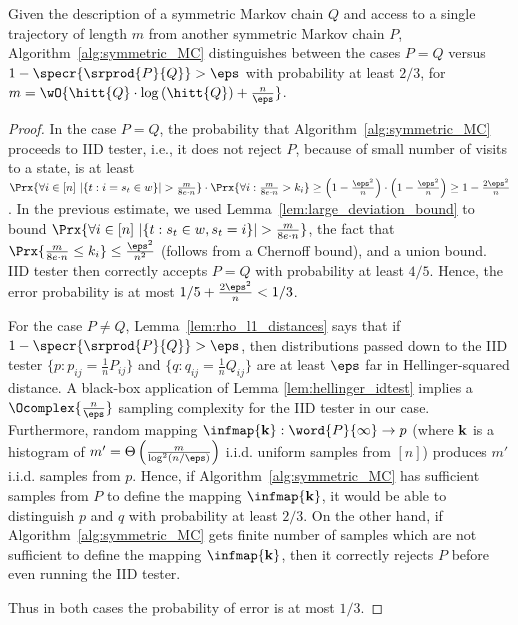 \begin{theorem}
Given the description of a symmetric Markov chain $Q$ and access to a single trajectory of length $m$ from another symmetric Markov chain $P$,
Algorithm~\ref{alg:symmetric_MC} distinguishes between the cases $P = Q$ versus $1-\specr{\srprod{P}{Q}}>\eps$ with probability at least $2/3$, for  $m=\wO{\hitt{Q}\cdot\log\left(\hitt{Q}\right)+\frac{n}{\eps}}$. 
\label{th:symmetric_ub}
\end{theorem}
\begin{proof}
	In the case $P=Q$, the probability that Algorithm~\ref{alg:symmetric_MC} proceeds to IID tester, i.e., it
	does not reject $P$, because of small number of visits to a state, is at least
	$\Prx{\forall i\in[n]~|\{t: i=s_t\in w\}|>\frac{m}{8e\cdot n}}\cdot\Prx{\forall i: \frac{m}{8e\cdot n}>k_i} \ge 
	\left(1-\frac{\eps^2}{n}\right)\cdot\left(1-\frac{\eps^2}{n}\right)\ge 1-\frac{2\eps^2}{n}$. In the previous estimate, we used Lemma~\ref{lem:large_deviation_bound} 
	to bound $\Prx{\forall i\in[n]~|\{t: s_t\in w, s_t=i\}|>\frac{m}{8e\cdot n}}$, the fact that $\Prx{\frac{m}{8e\cdot n} \le k_i} \le \frac{\eps^2}{n^2}$ (follows from a Chernoff bound), and a union bound.  IID tester then correctly accepts $P=Q$ with probability at least $4/5$.
	Hence, the error probability is at most $1/5+\frac{2\eps^2}{n}<1/3$.
	
	For the case $P\neq Q$, Lemma~\ref{lem:rho_l1_distances} says that if $1-\specr{\srprod{P}{Q}}>\eps$, then distributions passed down to the IID tester 
	$\{p: p_{ij}=\frac{1}{n}P_{ij}\}$ and $\{q: q_{ij}=\frac{1}{n}Q_{ij}\}$ are at least $\eps$ far in Hellinger-squared distance. A black-box application of Lemma \ref{lem:hellinger_idtest} implies a  $\Ocomplex{\frac{n}{\eps}}$ sampling complexity for the IID tester in our case.
	Furthermore,
	random mapping $\infmap{\vect{k}}:\word{P}{\infty}\to p$ (where $\mathbf{k}$ is a histogram of $m'=\Theta\left(\frac{m}{\log^2 (n/\eps)}\right)$ i.i.d. uniform samples from $[n]$) produces
	$m'$ i.i.d. samples from $p$. Hence, if Algorithm~\ref{alg:symmetric_MC} has sufficient samples from $P$ to define the mapping $\infmap{\vect{k}}$, it would be able to distinguish $p$ and $q$ with probability
	at least $2/3$. On the other hand, if Algorithm~\ref{alg:symmetric_MC} gets finite number of samples which are not sufficient to define the mapping $\infmap{\vect{k}}$, then 
	it correctly rejects $P$ before even running the IID tester.
	
	Thus in both cases the probability of error is at most $1/3$.
\end{proof}


